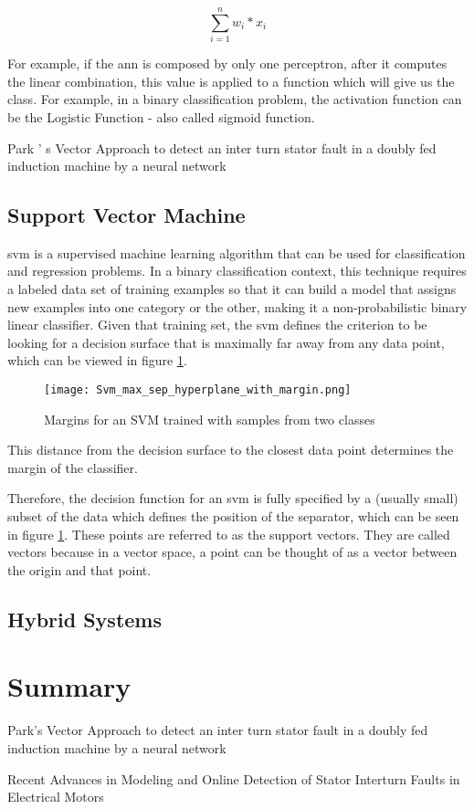 \begin{equation} 
\label{eq:linear_combination}
\sum_{i=1}^{n} w_{i}*x_{i}
\end{equation}

For example, if the \Acrshort{ann} is composed by only one perceptron, after it computes the linear combination, this value is applied to a function which will give us the class. For example, in a binary classification problem, the activation function can be the Logistic Function - also called sigmoid function.



Park ’ s Vector Approach to detect an inter turn stator fault in a doubly fed induction machine by a neural network


\subsection{Support Vector Machine} %
\label{sec:svm}

\Acrfull{svm} is a supervised machine learning algorithm that can be used for classification and regression problems. In a binary classification context, this technique requires a labeled data set of training examples so that it can build a model that assigns new examples into one category or the other, making it a non-probabilistic binary linear classifier.
Given that training set, the \Acrshort{svm} defines the criterion to be looking for a decision surface that is maximally far away from any data point, which can be viewed in figure \ref{fig:svm_margin}. 

\begin{figure}[htpb]
\centering
\texttt{[image: Svm\_max\_sep\_hyperplane\_with\_margin.png]}
\caption{Margins for an SVM trained with samples from two classes}
\label{fig:svm_margin}
\end{figure}

This distance from the decision surface to the closest data point determines the margin of the classifier.

Therefore, the decision function for an \Acrshort{svm} is fully specified by a (usually small) subset of the data which defines the position of the separator, which can be seen in figure \ref{fig:svm_margin}. These points are referred to as the support vectors. They are called vectors because in a vector space, a point can be thought of as a vector between the origin and that point.

\subsection{Hybrid Systems} %
\label{sec:other_approaches}






\section{Summary} %
\label{sec:related_work_summary}


Park’s Vector Approach to detect an inter turn stator fault in a doubly fed induction machine by a neural network 

Recent Advances in Modeling and Online Detection of Stator Interturn Faults in Electrical Motors
